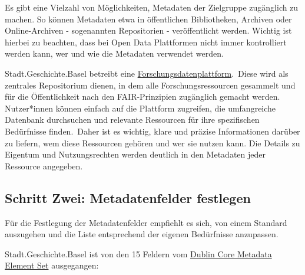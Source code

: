 \documentclass[
  nswissgerman,
  letterpaper,
  DIV=11,
  numbers=noendperiod]{scrartcl}
\begin{document}
Es gibt eine Vielzahl von Möglichkeiten, Metadaten der Zielgruppe
zugänglich zu machen. So können Metadaten etwa in öffentlichen
Bibliotheken, Archiven oder Online-Archiven - sogenannten Repositorien -
veröffentlicht werden. Wichtig ist hierbei zu beachten, dass bei Open
Data Plattformen nicht immer kontrolliert werden kann, wer und wie die
Metadaten verwendet werden.

\begin{tcolorbox}[enhanced jigsaw, arc=.35mm, bottomrule=.15mm, bottomtitle=1mm, breakable, colback=white, colbacktitle=quarto-callout-tip-color!10!white, colframe=quarto-callout-tip-color-frame, coltitle=black, left=2mm, leftrule=.75mm, opacityback=0, opacitybacktitle=0.6, rightrule=.15mm, title=\textcolor{quarto-callout-tip-color}{\faLightbulb}\hspace{0.5em}{Erfahrungen der Stadt.Geschichte.Basel}, titlerule=0mm, toprule=.15mm, toptitle=1mm]

Stadt.Geschichte.Basel betreibt eine
\href{https://forschung.stadtgeschichtebasel.ch/}{Forschungsdatenplattform}.~Diese
wird als zentrales Repositorium dienen, in dem alle Forschungsressourcen
gesammelt und für die Öffentlichkeit nach den FAIR-Prinzipien zugänglich
gemacht werden. Nutzer*innen können einfach auf die Plattform zugreifen,
die umfangreiche Datenbank durchsuchen und relevante Ressourcen für ihre
spezifischen Bedürfnisse finden.~Daher ist es wichtig, klare und präzise
Informationen darüber zu liefern, wem diese Ressourcen gehören und wer
sie nutzen kann. Die Details zu Eigentum und Nutzungsrechten werden
deutlich in den Metadaten jeder Ressource angegeben.

\end{tcolorbox}

\subsection{Schritt Zwei: Metadatenfelder
festlegen}\label{schritt-zwei-metadatenfelder-festlegen}

Für die Festlegung der Metadatenfelder empfiehlt es sich, von einem
Standard auszugehen und die Liste entsprechend der eigenen Bedürfnisse
anzupassen.

Stadt.Geschichte.Basel ist von den 15 Feldern vom
\href{https://www.dublincore.org/specifications/dublin-core/dces/}{Dublin
Core Metadata Element Set} ausgegangen:
\end{document}
